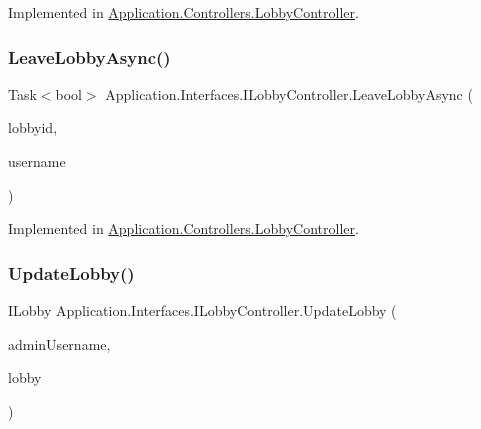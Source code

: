 Implemented in \mbox{\hyperlink{class_application_1_1_controllers_1_1_lobby_controller_aa075018713d8ac7fdf84cf6349e2f10d}{Application.\+Controllers.\+Lobby\+Controller}}.

\mbox{\label{interface_application_1_1_interfaces_1_1_i_lobby_controller_a46975c7e9219d5324f786542a23d9e7e}} 
\subsubsection{\texorpdfstring{Leave\+Lobby\+Async()}{LeaveLobbyAsync()}}
{\footnotesize\ttfamily Task$<$bool$>$ Application.\+Interfaces.\+I\+Lobby\+Controller.\+Leave\+Lobby\+Async (\begin{DoxyParamCaption}\item[{string}]{lobbyid,  }\item[{string}]{username }\end{DoxyParamCaption})}



Implemented in \mbox{\hyperlink{class_application_1_1_controllers_1_1_lobby_controller_a7f0fb3932a42b76d5e4a9788aa0510e0}{Application.\+Controllers.\+Lobby\+Controller}}.

\mbox{\label{interface_application_1_1_interfaces_1_1_i_lobby_controller_a4d0618e880423f15785360453bf90f90}} 
\subsubsection{\texorpdfstring{Update\+Lobby()}{UpdateLobby()}}
{\footnotesize\ttfamily I\+Lobby Application.\+Interfaces.\+I\+Lobby\+Controller.\+Update\+Lobby (\begin{DoxyParamCaption}\item[{string}]{admin\+Username,  }\item[{I\+Lobby}]{lobby }\end{DoxyParamCaption})}



